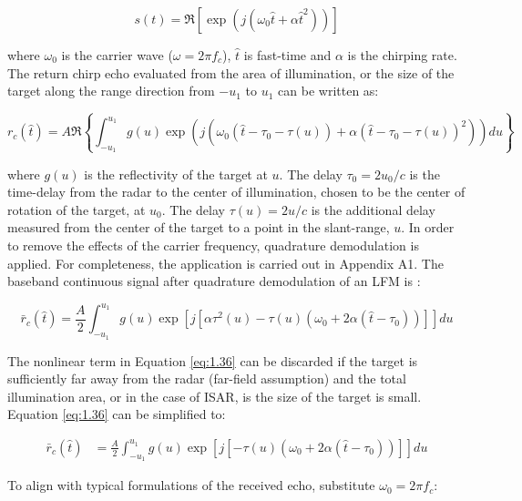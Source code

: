 \documentclass[fleqn,10pt]{olplainarticle}
\begin{document}
\begin{equation}
    s(t) = \Re[\exp (j(\omega_{0}\hat{t} + \alpha \hat{t}^{2}))]
\end{equation}

\noindent where $\omega_{0}$ is the carrier wave ($\omega = 2\pi f_{c}$), $\hat{t}$ is fast-time and $\alpha$ is the chirping rate. The return chirp echo evaluated from the area of illumination, or the size of the target along the range direction from $-u_1$ to $u_1$ can be written as:

\begin{equation}
    r_{c}(\hat{t}) = A \Re \left\{ \int_{-u_{1}}^{u_{1}} g(u) \exp(j(\omega_{0}(\hat{t} - \tau_{0} - \tau(u)) + \alpha (\hat{t} - \tau_{0} - \tau(u))^{2}))du \right\}
    \label{eq:rc_t_tau}
\end{equation}

\noindent where $g(u)$ is the reflectivity of the target at $u$. The delay  $\tau_{0} = 2u_{0}/c$ is the time-delay from the radar to the center of illumination, chosen to be the center of rotation of the target, at $u_{0}$. The delay $\tau(u) = 2u/c$ is the additional delay measured from the center of the target to a point in the slant-range, $u$. In order to remove the effects of the carrier frequency, quadrature demodulation is applied. For completeness, the application is carried out in Appendix A1. The baseband continuous signal after quadrature demodulation of an LFM is \citep{Jakowatz1996}:

\begin{equation}
    \bar{r}_{c}(\hat{t}) = \frac{A}{2} \int_{-u_{1}}^{u_{1}} g(u) \exp [j[\alpha \tau^{2}(u) - \tau (u)(\omega_0 + 2\alpha (\hat{t} - \tau_{0}))]] du
    \label{eq:1.36}
\end{equation}

\noindent The nonlinear term in Equation \ref{eq:1.36} can be discarded if the target is sufficiently far away from the radar (far-field assumption) and the total illumination area, or in the case of ISAR, is the size of the target is small. Equation \ref{eq:1.36} can be simplified to:

\begin{equation}
    \begin{aligned}
        \bar{r}_{c}(\hat{t}) &= \frac{A}{2} \int_{-u_{1}}^{u_{1}} g(u) \exp [j[- \tau (u)(\omega_0 + 2\alpha (\hat{t} - \tau_{0}))]] du 
    \end{aligned}
\end{equation}

\noindent To align with typical formulations of the received echo, substitute $\omega_{0} = 2\pi f_{c}$:
\end{document}
